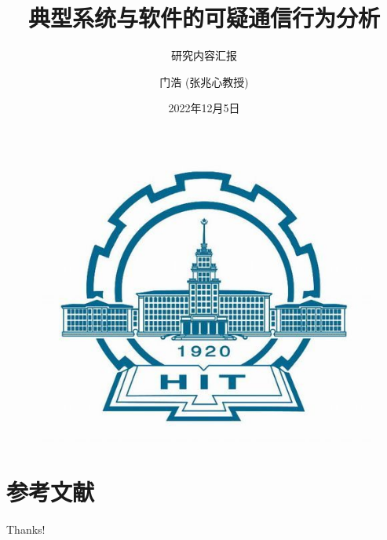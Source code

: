 \documentclass[aspectratio=169]{beamer}
\author[门浩]{门浩  (张兆心教授)}
\title{典型系统与软件的可疑通信行为分析}
\subtitle{研究内容汇报}
\institute[计算机科学与技术]{哈尔滨工业大学（威海）计算机科学与技术学院}
\date{2022年12月5日}
\begin{document}
 
\begin{frame}
    \titlepage
    \begin{figure}[htpb]
        \begin{center}
            \includegraphics[width=0.15\linewidth]{pic/hitcolor.jpg}
        \end{center}
    \end{figure}
\end{frame}

\begin{frame}
    \tableofcontents[sectionstyle=show,subsectionstyle=show/shaded/hide,subsubsectionstyle=show/shaded/hide]
\end{frame}
 







 


% 


\section{参考文献}

\begin{frame}[allowframebreaks]
    \tiny
    
\end{frame}
 
\begin{frame}
    \begin{center}
        {\Huge\calligra Thanks!}
    \end{center}
\end{frame}
\end{document}
